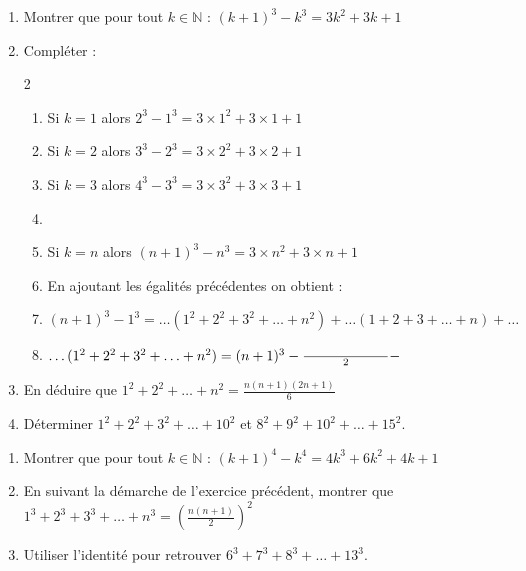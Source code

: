 \documentclass[main.tex]{subfiles}
\begin{document}
\begin{exercise}\label{chapter05:exercise:suites50}\hfill 
\begin{enumerate}[leftmargin=*,label=\arabic*)]
	\item Montrer que pour tout $k\in\mathbb{N}$ : $(k+1)^3-k^3=3k^2+3k+1$
	\item Compléter : 
	\begin{spacing}{2}
		\vspace{-0.5em}
		\begin{enumerate}[leftmargin=*,label={}]
			\item  Si $k=1$ alors \dotfill $2^3-1^3=3\times 1^2+ 3\times 1 + 1$
			\item  Si $k=2$ alors \dotfill $3^3-2^3=3\times 2^2+ 3\times 2 + 1$
			\item  Si $k=3$ alors \dotfill $4^3-3^3=3\times 3^2+ 3\times 3 + 1$
			\item[...] 
			\item  Si $k=n$ alors \dotfill $(n+1)^3-n^3=3\times n^2+ 3\times n + 1$
			\item En ajoutant les égalités précédentes on obtient :
			\item $(n+1)^3-1^3= \ldots (1^2+2^2+3^2+\ldots +n^2)+\ldots(1+2+3+\ldots+n) + \ldots $
			\item $\ldots (1^2+2^2+3^2+\ldots +n^2)=(n+1)^3-\frac{\qquad\qquad\qquad }{2}-\dotfill $
		\end{enumerate}
	\end{spacing}
	\vspace{-0.75em}
	\item En déduire que $1^2+2^2+\ldots +n^2=\frac{n(n+1)(2n+1)}{6}$\medskip
	\item Déterminer $1^2+2^2+3^2+\ldots +10^2$ et $8^2+9^2+10^2+\ldots+15^2$.
\end{enumerate} 
\end{exercise}
\begin{problem}\label{chapter05:exercise:suites51} \hfill
	\begin{enumerate}[leftmargin=*,label=\arabic*)]
		\item Montrer que pour tout $k\in\mathbb{N}$ : $(k+1)^4-k^4=4k^3+6k^2+4k+1$
		\item En suivant la démarche de l'exercice précédent, montrer que $1^3+2^3+3^3+\ldots + n^3=\left(\frac{n(n+1)}{2}\right)^2$
		\item Utiliser l'identité pour retrouver $6^3+7^3+8^3+\ldots+13^3$.
	\end{enumerate} 
\end{problem}
\end{document}
